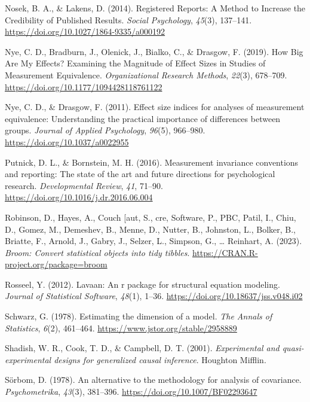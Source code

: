\documentclass[
  man,floatsintext]{apa7}
\newlength{\cslhangindent}
\newenvironment{CSLReferences}[2] %
 {\begin{list}{}{%
  \setlength{\itemindent}{0pt}
  \setlength{\leftmargin}{0pt}
  \setlength{\parsep}{0pt}
  \ifodd #1
   \setlength{\leftmargin}{\cslhangindent}
   \setlength{\itemindent}{-1\cslhangindent}
  \fi
  \setlength{\itemsep}{#2\baselineskip}}}
 {\end{list}}
\begin{document}
\begin{CSLReferences}{1}{0}
Nosek, B. A., \& Lakens, D. (2014). Registered Reports: A Method to Increase the Credibility of Published Results. \emph{Social Psychology}, \emph{45}(3), 137--141. \url{https://doi.org/10.1027/1864-9335/a000192}

Nye, C. D., Bradburn, J., Olenick, J., Bialko, C., \& Drasgow, F. (2019). How Big Are My Effects? Examining the Magnitude of Effect Sizes in Studies of Measurement Equivalence. \emph{Organizational Research Methods}, \emph{22}(3), 678--709. \url{https://doi.org/10.1177/1094428118761122}

Nye, C. D., \& Drasgow, F. (2011). Effect size indices for analyses of measurement equivalence: Understanding the practical importance of differences between groups. \emph{Journal of Applied Psychology}, \emph{96}(5), 966--980. \url{https://doi.org/10.1037/a0022955}

Putnick, D. L., \& Bornstein, M. H. (2016). Measurement invariance conventions and reporting: The state of the art and future directions for psychological research. \emph{Developmental Review}, \emph{41}, 71--90. \url{https://doi.org/10.1016/j.dr.2016.06.004}

Robinson, D., Hayes, A., Couch {[}aut, S., cre, Software, P., PBC, Patil, I., Chiu, D., Gomez, M., Demeshev, B., Menne, D., Nutter, B., Johnston, L., Bolker, B., Briatte, F., Arnold, J., Gabry, J., Selzer, L., Simpson, G., \ldots{} Reinhart, A. (2023). \emph{Broom: Convert statistical objects into tidy tibbles}. \url{https://CRAN.R-project.org/package=broom}

Rosseel, Y. (2012). Lavaan: An r package for structural equation modeling. \emph{Journal of Statistical Software}, \emph{48}(1), 1--36. \url{https://doi.org/10.18637/jss.v048.i02}

Schwarz, G. (1978). Estimating the dimension of a model. \emph{The Annals of Statistics}, \emph{6}(2), 461--464. \url{https://www.jstor.org/stable/2958889}

Shadish, W. R., Cook, T. D., \& Campbell, D. T. (2001). \emph{Experimental and quasi-experimental designs for generalized causal inference}. Houghton Mifflin.

Sörbom, D. (1978). An alternative to the methodology for analysis of covariance. \emph{Psychometrika}, \emph{43}(3), 381--396. \url{https://doi.org/10.1007/BF02293647}


\end{CSLReferences}
\end{document}
